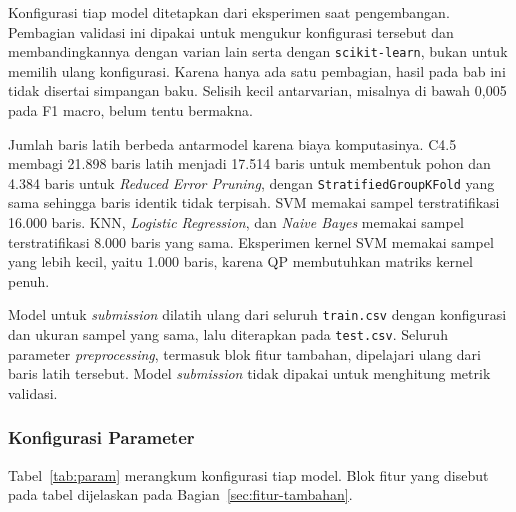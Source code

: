 Konfigurasi tiap model ditetapkan dari eksperimen saat pengembangan. Pembagian
validasi ini dipakai untuk mengukur konfigurasi tersebut dan membandingkannya
dengan varian lain serta dengan \texttt{scikit-learn}, bukan untuk memilih
ulang konfigurasi. Karena hanya ada satu pembagian, hasil pada bab ini tidak
disertai simpangan baku. Selisih kecil antarvarian, misalnya di bawah 0,005
pada F1 macro, belum tentu bermakna.

Jumlah baris latih berbeda antarmodel karena biaya komputasinya. C4.5
membagi 21.898 baris latih menjadi 17.514 baris untuk membentuk pohon dan
4.384 baris untuk \textit{Reduced Error Pruning}, dengan
\texttt{StratifiedGroupKFold} yang sama sehingga baris identik tidak
terpisah. SVM memakai sampel terstratifikasi 16.000 baris. KNN,
\textit{Logistic Regression}, dan \textit{Naive Bayes} memakai sampel
terstratifikasi 8.000 baris yang sama. Eksperimen kernel SVM memakai sampel
yang lebih kecil, yaitu 1.000 baris, karena QP membutuhkan matriks kernel
penuh.

Model untuk \textit{submission} dilatih ulang dari seluruh \texttt{train.csv}
dengan konfigurasi dan ukuran sampel yang sama, lalu diterapkan pada
\texttt{test.csv}. Seluruh parameter \textit{preprocessing}, termasuk blok
fitur tambahan, dipelajari ulang dari baris latih tersebut. Model
\textit{submission} tidak dipakai untuk menghitung metrik validasi.

\subsubsection{Konfigurasi Parameter}

Tabel~\ref{tab:param} merangkum konfigurasi tiap model. Blok fitur yang
disebut pada tabel dijelaskan pada Bagian~\ref{sec:fitur-tambahan}.

